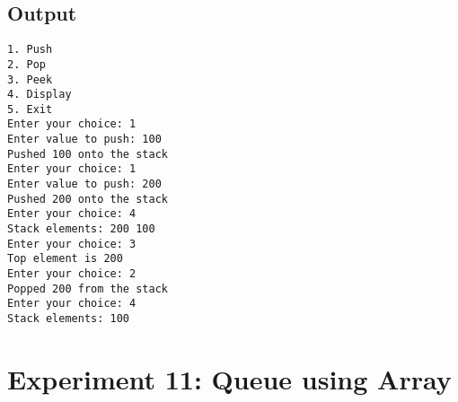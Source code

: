 \documentclass[12pt,a4paper]{article}
\begin{document}
\subsection*{Output}
\begin{tcolorbox}[terminalstyle, title=Sample Output]
\texttt{1. Push\\2. Pop\\3. Peek\\4. Display\\5. Exit\\
Enter your choice: 1\\
Enter value to push: 100\\
Pushed 100 onto the stack\\
Enter your choice: 1\\
Enter value to push: 200\\
Pushed 200 onto the stack\\
Enter your choice: 4\\
Stack elements: 200 100 \\
Enter your choice: 3\\
Top element is 200\\
Enter your choice: 2\\
Popped 200 from the stack\\
Enter your choice: 4\\
Stack elements: 100}
\end{tcolorbox}

\newpage
\section*{Experiment 11: Queue using Array}
\end{document}

